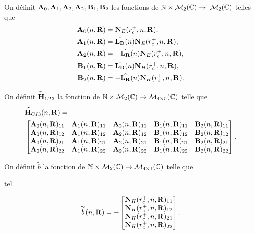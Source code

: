     \begin{defn}
      On définit \(\mathbf{A}_0,\mathbf{A}_1,\mathbf{A}_2,\mathbf{A}_2,\mathbf{B}_1,\mathbf{B}_2\) les fonctions de \(\mathbb N \times \mathcal{M}_2(\mathbb C) \rightarrow \ \mathcal{M}_2(\mathbb C)\) telles que        
      \begin{align*}
        \mathbf{A}_0(n,\mathbf{R}) &= \mathbf{N}_E(r_c^+,n,\mathbf{R}),
        \\
        \mathbf{A}_1(n,\mathbf{R}) &= \hat{\mathbf{L_D}}(n)\mathbf{N}_E(r_c^+,n,\mathbf{R}),
        \\
        \mathbf{A}_2(n,\mathbf{R}) &= -\hat{\mathbf{L_R}}(n)\mathbf{N}_E(r_c^+,n,\mathbf{R}),
        \\
        \mathbf{B}_1(n,\mathbf{R}) &= \hat{\mathbf{L_D}}(n)\mathbf{N}_H(r_c^+,n,\mathbf{R}),
        \\
        \mathbf{B}_2(n,\mathbf{R}) &= -\hat{\mathbf{L_R}}(n)\mathbf{N}_H(r_c^+,n,\mathbf{R}).
      \end{align*}

      On définit \(\overset{\thicksim}{\mathbf{H}}_{CI3}\) la fonction de \(\mathbb N \times \mathcal{M}_2(\mathbb C) \rightarrow \mathcal{M}_{4\times5}(\mathbb C)\) telle que
      \begin{align*}
        & \overset{\thicksim}{\mathbf{H}}_{CI3}(n,\mathbf{R}) =  \\ &
        \begin{bmatrix}
          \mathbf{A}_0(n,\mathbf{R})_{11} & \mathbf{A}_1(n,\mathbf{R})_{11} & \mathbf{A}_2(n,\mathbf{R})_{11} & \mathbf{B}_1(n,\mathbf{R})_{11} & \mathbf{B}_2(n,\mathbf{R})_{11}
          \\
          \mathbf{A}_0(n,\mathbf{R})_{12} & \mathbf{A}_1(n,\mathbf{R})_{12} & \mathbf{A}_2(n,\mathbf{R})_{12} & \mathbf{B}_1(n,\mathbf{R})_{12} & \mathbf{B}_2(n,\mathbf{R})_{12}
          \\
          \mathbf{A}_0(n,\mathbf{R})_{21} & \mathbf{A}_1(n,\mathbf{R})_{21} & \mathbf{A}_2(n,\mathbf{R})_{21} & \mathbf{B}_1(n,\mathbf{R})_{21} & \mathbf{B}_2(n,\mathbf{R})_{21}
          \\
          \mathbf{A}_0(n,\mathbf{R})_{22} & \mathbf{A}_1(n,\mathbf{R})_{22} & \mathbf{A}_2(n,\mathbf{R})_{22} & \mathbf{B}_1(n,\mathbf{R})_{22} & \mathbf{B}_2(n,\mathbf{R})_{22}
        \end{bmatrix}.
      \end{align*}

      On définit \(\tilde{b}\) la fonction de \(\mathbb N \times \mathcal{M}_2(\mathbb C) \rightarrow \mathcal{M}_{4\times1}(\mathbb C)\) telle que
\begin{REM}
  tel
\end{REM} 
      \begin{equation*}
        \overset{\thicksim}{b}(n,\mathbf{R}) = -
        \begin{bmatrix}
          \mathbf{N}_H(r_c^+,n,\mathbf{R})_{11}
          \\
          \mathbf{N}_H(r_c^+,n,\mathbf{R})_{12}
          \\
          \mathbf{N}_H(r_c^+,n,\mathbf{R})_{21}
          \\
          \mathbf{N}_H(r_c^+,n,\mathbf{R})_{22}
        \end{bmatrix}.
      \end{equation*}
    \end{defn}

